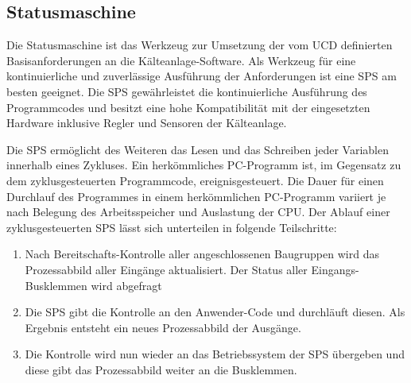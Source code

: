 \subsection{Statusmaschine}
\label{subsec:Statusmaschine}

Die Statusmaschine ist das Werkzeug zur Umsetzung der vom UCD definierten Basisanforderungen an die Kälteanlage-Software. Als Werkzeug für eine kontinuierliche und zuverlässige Ausführung der Anforderungen ist eine SPS am besten geeignet. Die SPS gewährleistet die kontinuierliche Ausführung des Programmcodes und besitzt eine hohe Kompatibilität mit der eingesetzten Hardware inklusive Regler und Sensoren der Kälteanlage. 

Die SPS ermöglicht des Weiteren das Lesen und das Schreiben jeder Variablen innerhalb eines Zykluses. Ein herkömmliches PC-Programm ist, im Gegensatz zu dem zyklusgesteuerten Programmcode, ereignisgesteuert. Die Dauer für einen Durchlauf des Programmes in einem herkömmlichen PC-Programm variiert je nach Belegung des Arbeitsspeicher und Auslastung der CPU. Der Ablauf einer zyklusgesteuerten SPS lässt sich unterteilen in folgende Teilschritte:

\begin{enumerate}
\item	Nach Bereitschafts-Kontrolle aller angeschlossenen Baugruppen wird das Prozessabbild aller Eingänge aktualisiert. Der Status aller Eingangs-Busklemmen wird abgefragt
\item 	Die SPS gibt die Kontrolle an den Anwender-Code und durchläuft diesen. Als Ergebnis entsteht ein neues Prozessabbild der Ausgänge. 
\item	Die Kontrolle wird nun wieder an das Betriebssystem der SPS übergeben und diese gibt das Prozessabbild weiter an die Busklemmen. 
\end{enumerate}


